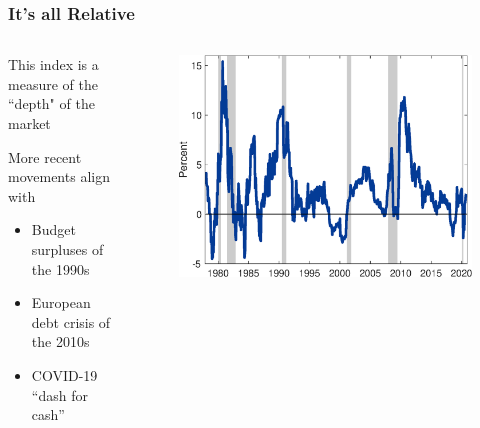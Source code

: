 \documentclass[11pt, handout, aspectratio=169]{beamer}
\newenvironment{wideitemize}{\itemize\addtolength{\itemsep}{10pt}}{\enditemize}
\begin{document}
\begin{frame}
\frametitle{It's all Relative}
\begin{columns}[t]
	\begin{column}{.45\textwidth}
		\begin{wideitemize}
			\item This index is a measure of the ``depth" of the market
			\item More recent movements align with
			\begin{itemize}
				\item Budget surpluses of the 1990s
				\item European debt crisis of the 2010s
				\item COVID-19 ``dash for cash''
			\end{itemize}
		\end{wideitemize}
	\end{column}
	\begin{column}{.55\textwidth}
		\begin{figure}[p]
			\centering
			\includegraphics[width=\textwidth]{../Figures/YoYGrowth_MonServices.eps}
		\end{figure}
	\end{column}
\end{columns}
\end{frame}
\end{document}
